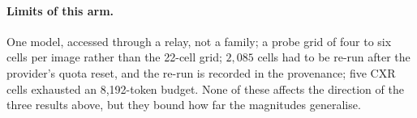\paragraph{Limits of this arm.} One model, accessed through a relay, not a family; a probe grid of
four to six cells per image rather than the 22-cell grid; $2{,}085$ cells had to be
re-run after the provider's quota reset, and the re-run is recorded in the
provenance; five CXR cells exhausted an 8{,}192-token budget. None of these affects
the direction of the three results above, but they bound how far the magnitudes
generalise.
